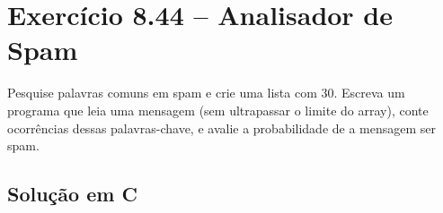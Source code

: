 \documentclass[12pt,a4paper]{article}
\begin{document}
\newpage

\section{Exercício 8.44 -- Analisador de Spam}

\begin{enunciadoBox}[Enunciado 8.44]
Pesquise palavras comuns em spam e crie uma lista com 30. Escreva um programa que
leia uma mensagem (sem ultrapassar o limite do array), conte ocorrências dessas
palavras-chave, e avalie a probabilidade de a mensagem ser spam.
\end{enunciadoBox}

\subsection*{Solução em C}
\end{document}
